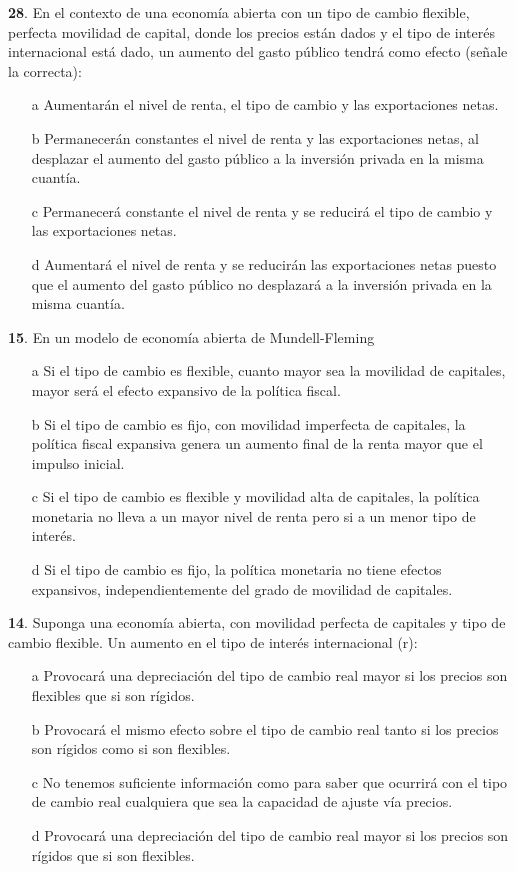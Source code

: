 \documentclass{nuevotema}
\begin{document}

\textbf{28}. En el contexto de una economía abierta con un tipo de cambio flexible, perfecta movilidad de capital, donde los precios están dados y el tipo de interés internacional está dado, un aumento del gasto público tendrá como efecto (señale la correcta):
\begin{enumerate}
	\item[a] Aumentarán el nivel de renta, el tipo de cambio y las exportaciones netas.
	\item[b] Permanecerán constantes el nivel de renta y las exportaciones netas, al desplazar el aumento del gasto público a la inversión privada en la misma cuantía.
	\item[c] Permanecerá constante el nivel de renta y se reducirá el tipo de cambio y las exportaciones netas.
	\item[d] Aumentará el nivel de renta y se reducirán las exportaciones netas puesto que el aumento del gasto público no desplazará a la inversión privada en la misma cuantía.
\end{enumerate}

\textbf{15}. En un modelo de economía abierta de Mundell-Fleming
\begin{enumerate}
	\item[a] Si el tipo de cambio es flexible, cuanto mayor sea la movilidad de capitales, mayor será el efecto expansivo de la política fiscal.
	\item[b] Si el tipo de cambio es fijo, con movilidad imperfecta de capitales, la política fiscal expansiva genera un aumento final de la renta mayor que el impulso inicial.
	\item[c] Si el tipo de cambio es flexible y movilidad alta de capitales, la política monetaria no lleva a un mayor nivel de renta pero si a un menor tipo de interés.
	\item[d] Si el tipo de cambio es fijo, la política monetaria no tiene efectos expansivos, independientemente del grado de movilidad de capitales.
\end{enumerate}


\textbf{14}. Suponga una economía abierta, con movilidad perfecta de capitales y tipo de cambio flexible. Un aumento en el tipo de interés internacional (r):
\begin{enumerate}
	\item[a] Provocará una depreciación del tipo de cambio real mayor si los precios son flexibles que si son rígidos.
	\item[b] Provocará el mismo efecto sobre el tipo de cambio real tanto si los precios son rígidos como si son flexibles.
	\item[c] No tenemos suficiente información como para saber que ocurrirá con el tipo de cambio real cualquiera que sea la capacidad de ajuste vía precios.
	\item[d] Provocará una depreciación del tipo de cambio real mayor si los precios son rígidos que si son flexibles.
\end{enumerate}
\end{document}
